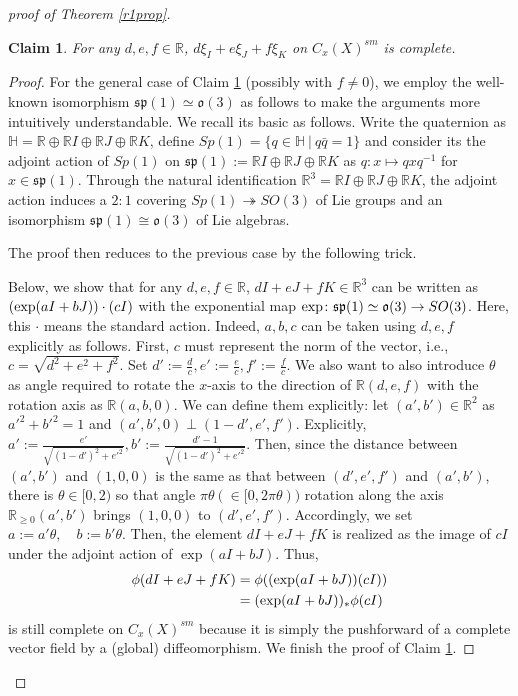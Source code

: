 \documentclass[12pt,a4paper]{amsart}
\newtheorem{Claim}[Thm]{Claim}
\theoremstyle{remark}
\theoremstyle{definition}
\def\R{\mathbb{R}}
\begin{document}
\begin{proof}[proof of Theorem \ref{r1prop}]
\begin{Claim}\label{claim:completevf3}
For any $d,e,f\in \R$, 
$d\xi_I+e\xi_J+f\xi_K$ on $C_x(X)^{sm}$ is complete. 
\end{Claim}
\begin{proof}
For the general case of Claim \ref{claim:completevf3} 
(possibly with $f \neq 0$), we employ the well-known isomorphism 
$\mathfrak{sp}(1) \simeq \mathfrak{o}(3)$ as follows
to make the arguments more intuitively 
understandable. 
We recall its basic as follows. 
Write the quaternion as $\mathbb{H} = \R \oplus \R I \oplus \R J \oplus \R K$, 
define $Sp(1) = \{q \in \mathbb{H}\: \vert \: q\bar{q} = 1\}$ and consider its 
the adjoint action of $Sp(1)$ on $\mathfrak{sp}(1) :=\R I \oplus \R J \oplus \R K$ as $q\colon x \mapsto qxq^{-1}$ for $x \in \mathfrak{sp}(1)$. 
Through the natural identification $\R^3 = \R I \oplus \R J \oplus \R K$, 
the adjoint action induces a $2:1$ 
covering $Sp(1) \twoheadrightarrow SO(3)$ of Lie groups and an isomorphism 
$\mathfrak{sp}(1) \cong \mathfrak{o}(3)$ of Lie algebras.

The proof then reduces to the previous case by the 
following trick. 

Below, we show 
that for any $d,e,f\in \R$, 
$dI+eJ+fK \in \R^3$ can be written as 
$({\rm exp}(aI+bJ))\cdot (cI)$ with the exponential map 
${\rm exp}\colon \mathfrak{sp}(1)\simeq \mathfrak{o}(3)
\to SO(3)$. Here, this $\cdot$ means the standard 
action. 
Indeed, $a,b,c$ can be taken using $d,e,f$ explicitly as follows. 
First, $c$ must represent the norm of the vector, i.e., 
$c = \sqrt{d^2 + e^2 + f^2}$. Set $d':=\frac{d}{c}, e':=\frac{e}{c}, 
f':=\frac{f}{c}$. 
We also want to also introduce $\theta$ as angle required to rotate the $x$-axis 
to the direction of $\R(d, e, f)$ with 
the rotation axis as $\R(a,b,0)$. 
We can define them explicitly: 
let $(a',b')\in \R^2$ as 
$a'^2+b'^2=1$ and $(a',b',0)\perp (1-
d',e',f')$. Explicitly, 
$a':=\frac{e'}{\sqrt{(1-d')^2+e'^2}}, 
b':=\frac{d'-1}{\sqrt{(1-d')^2+e'^2}}$. 
Then, since the distance between 
$(a',b')$ and $(1,0,0)$ is the same as 
that between $(d',e',f')$ and $(a',b')$, 
there is $\theta\in [0,2)$ 
so that angle $\pi\theta (\in [0, 2\pi\theta))$ rotation 
along the axis $\R_{\ge 0}(a',b')$ brings 
$(1,0,0)$ to $(d',e',f')$. Accordingly, 
we set 
$a:= a' \theta, \quad b:=b' \theta$. 
Then, the element $dI+eJ+fK$ is realized 
as the image of $cI$ 
under the adjoint action of $\exp(aI+bJ)$. 
Thus, 
\begin{align*}
\phi(dI+eJ+fK)&=\phi(({\rm exp}(aI+bJ))(cI))\\
&=({\rm exp}(aI+bJ))_*\phi(cI)
\end{align*}
is still complete on $C_x(X)^{sm}$ because 
it is simply the pushforward of a complete vector field by a (global) 
diffeomorphism. We finish the proof of 
Claim \ref{claim:completevf3}. 
\end{proof}


\end{proof}
\end{document}
